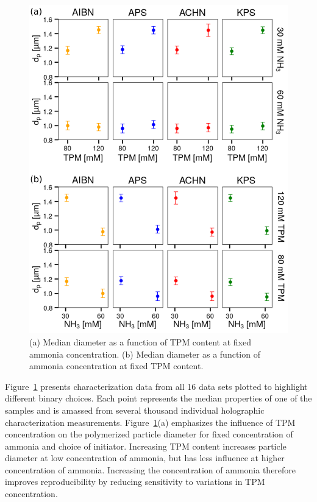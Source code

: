 \documentclass[journal=langd5,manuscript=article,layout=twocolumn]{achemso}
\begin{document}
\begin{figure}[!t]
    \centering
    \includegraphics[width=\columnwidth]{longitudinal_summary_02}
    \caption{
     (a) Median diameter as a function of TPM content at fixed ammonia concentration.
     (b) Median diameter as a function of ammonia concentration at fixed TPM content.}
    \label{fig:choices}
\end{figure}

Figure~\ref{fig:choices} presents
characterization data from all \num{16} data sets plotted to highlight different
binary choices.
Each point represents the median properties of
one of the samples and is amassed 
from several thousand
individual holographic characterization measurements.
Figure~\ref{fig:choices}(a) 
emphasizes the influence of TPM concentration
on the polymerized particle diameter
for fixed concentration of 
ammonia and choice 
of initiator.
Increasing TPM content increases particle
diameter at low concentration of ammonia,
but has less influence at higher concentration
of ammonia.
Increasing the concentration of 
ammonia
therefore improves reproducibility by 
reducing sensitivity to variations in TPM concentration.
\end{document}
